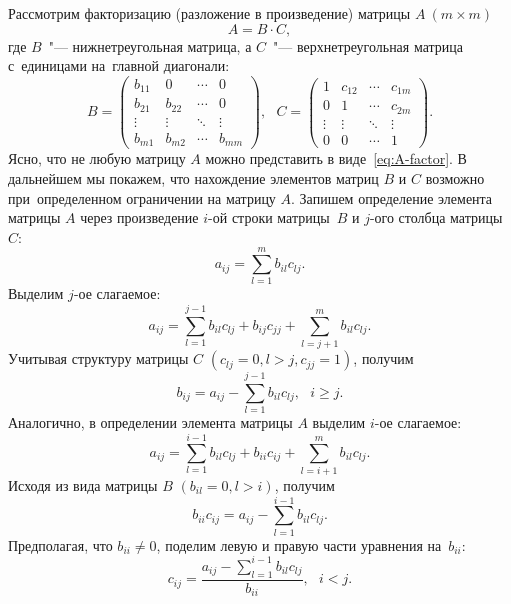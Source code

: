 \documentclass[11pt,a4paper,twoside,listtotoc,bibtotoc]{report}
\numberwithin{equation}{section}
\theoremstyle{definition}
\theoremstyle{plain}
\begin{document}
Рассмотрим факторизацию (разложение в произведение) матрицы $A~(m \times m)$
%
\begin{equation}
    \label{eq:A-factor}
    A = B \cdot C,
\end{equation}
%
где $B$~"--- нижнетреугольная матрица, а $C$~"--- верхнетреугольная матрица
с~единицами на~главной диагонали:
%
$$
    B =
    \begin{pmatrix}
        b_{11} & 0      & \cdots & 0      \\
        b_{21} & b_{22} & \cdots & 0      \\
        \vdots & \vdots & \ddots & \vdots \\
        b_{m1} & b_{m2} & \cdots & b_{mm}
    \end{pmatrix},
    ~~~C =
    \begin{pmatrix}
        1      & c_{12} & \cdots & c_{1m} \\
        0      & 1      & \cdots & c_{2m} \\
        \vdots & \vdots & \ddots & \vdots \\
        0      & 0      & \cdots & 1
    \end{pmatrix}.
$$
%
Ясно, что не любую матрицу $A$ можно представить в виде~\eqref{eq:A-factor}.
В дальнейшем мы покажем, что нахождение элементов матриц $B$ и $C$
возможно при~определенном ограничении на матрицу $A$.
Запишем определение элемента матрицы $A$ через произведение $i$-ой строки
матрицы~$B$ и $j$-ого столбца матрицы~$C$:
%
$$
    a_{ij} = \sum\limits_{l=1}^m b_{il}c_{lj}.
$$
%
Выделим $j$-ое слагаемое:
%
$$
    a_{ij} = \sum\limits_{l=1}^{j-1}b_{il}c_{lj} + b_{ij}c_{jj} +
             \sum\limits_{l=j+1}^m b_{il}c_{lj}.
$$
%
Учитывая структуру матрицы $C$ $(c_{lj} = 0, l > j, c_{jj} = 1)$, получим
%
\begin{equation}
    \label{eq:b-ij}
    b_{ij} = a_{ij} - \sum\limits_{l=1}^{j-1}b_{il}c_{lj},~~~i \geqslant j.
\end{equation}
%
Аналогично, в определении элемента матрицы $A$ выделим $i$-ое слагаемое:
%
$$
    a_{ij} = \sum\limits_{l=1}^{i-1}b_{il}c_{lj} + b_{ii}c_{ij} +
             \sum\limits_{l=i+1}^m b_{il}c_{lj}.
$$
%
Исходя из вида матрицы $B$ $(b_{il} = 0, l > i)$, получим
%
$$
    b_{ii}c_{ij} = a_{ij} - \sum\limits_{l=1}^{i-1}b_{il}c_{lj}.
$$
%
Предполагая, что $b_{ii} \ne 0$, поделим левую и правую части уравнения
на~$b_{ii}$:
%
\begin{equation}
    \label{eq:c-ij}
    c_{ij} = \frac{a_{ij} - \sum\limits_{l=1}^{i-1}b_{il}c_{lj}}{b_{ii}},
    ~~~i < j.
\end{equation}
\end{document}

